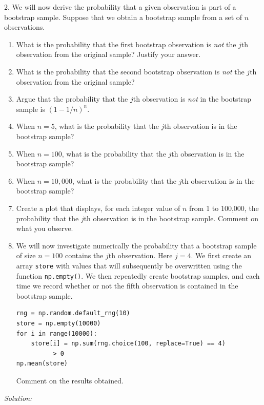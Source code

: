 \documentclass[11pt,a4paper]{article}
\newif\ifsolucoes
\newcommand{\espacoresol}{4.5cm}   %
\numberwithin{equation}{questao}   %
\newcommand{\resolespaco}{\ifsolucoes\else\par\textit{Solution:}\vspace{\espacoresol}\par\fi}
\begin{document}
2. We will now derive the probability that a given observation is part of a bootstrap sample.
Suppose that we obtain a bootstrap sample from a set of $n$ observations.
\begin{enumerate}[label=(\alph*),leftmargin=2.4em]
\item What is the probability that the first bootstrap observation is \emph{not} the $j$th
observation from the original sample? Justify your answer.
\item What is the probability that the second bootstrap observation is \emph{not} the $j$th
observation from the original sample?
\item Argue that the probability that the $j$th observation is \emph{not} in the bootstrap sample
is $(1-1/n)^n$.
\item When $n=5$, what is the probability that the $j$th observation is in the bootstrap sample?
\item When $n=100$, what is the probability that the $j$th observation is in the bootstrap sample?
\item When $n=10{,}000$, what is the probability that the $j$th observation is in the bootstrap
sample?
\item Create a plot that displays, for each integer value of $n$ from 1 to 100,000, the probability
that the $j$th observation is in the bootstrap sample. Comment on what you observe.
\item We will now investigate numerically the probability that a bootstrap sample of size $n=100$
contains the $j$th observation. Here $j=4$. We first create an array \texttt{store} with values that
will subsequently be overwritten using the function \texttt{np.empty()}. We then repeatedly create
bootstrap samples, and each time we record whether or not the fifth observation is contained in the
bootstrap sample.
{\small
\begin{verbatim}
rng = np.random.default_rng(10)
store = np.empty(10000)
for i in range(10000):
    store[i] = np.sum(rng.choice(100, replace=True) == 4)
          > 0
np.mean(store)
\end{verbatim}
}
Comment on the results obtained.
\end{enumerate}
\resolespaco
\end{document}
